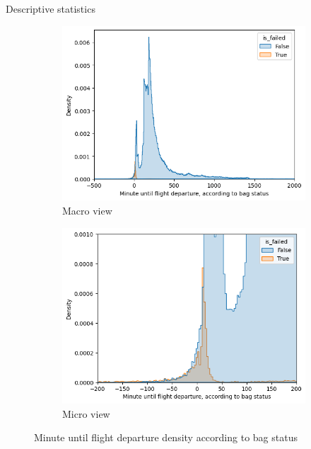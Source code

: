 \documentclass{beamer}
\begin{document}
\begin{frame}{Descriptive statistics}
    \begin{figure}[ht]
      \centering
      \begin{subfigure}{0.48\textwidth}
        \includegraphics[width=\linewidth]{Minute until flight departure_2.png}
        \caption{Macro view}
      \end{subfigure}
      \hfill
      \begin{subfigure}{0.48\textwidth}
        \includegraphics[width=\linewidth]{Minute until flight departure_3.png}
        \caption{Micro view}
      \end{subfigure}
      \caption{Minute until flight departure density according to bag status}
      \label{fig:Minute until flight departure distribution according to bag status}
    \end{figure}
\end{frame}
\end{document}
